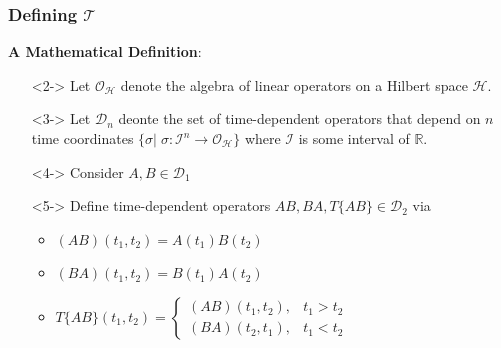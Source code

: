 \documentclass{beamer}
\begin{document}
\begin{frame}
\frametitle{Defining $\mathscr{T}$}
\alert{\textbf{A Mathematical Definition}:}
\begin{itemize}
    \item[\textbullet]<2-> Let $\mathcal{O}_{\mathcal{H}}$ denote the algebra of linear operators on a Hilbert space $\mathcal{H}$.
    \item[\textbullet]<3-> Let $\mathcal{D}_n$ deonte the set of time-dependent operators that depend on $n$ time coordinates $\{\sigma|\;\sigma:\mathcal{I}^n\to\mathcal{O}_{\mathcal{H}}\}$ where $\mathcal{I}$ is some interval of $\mathbb{R}$.
    \item[\textbullet]<4-> Consider $A, B \in \mathcal{D}_1$
    \item[\textbullet]<5-> Define time-dependent operators $AB, BA, T\{AB\} \in \mathcal{D}_2$ via
    \begin{itemize}
        \item<6-> $(AB)(t_1, t_2) = A(t_1)B(t_2)$
        \vspace{0.1cm}
        \item<7-> $(BA)(t_1, t_2) = B(t_1)A(t_2)$
        \vspace{0.1cm}
        \item<8-> $T\{AB\}(t_1, t_2) = \begin{cases}
			(AB)(t_1, t_2), & t_1 > t_2 \\
            (BA)(t_2, t_1), & t_1 < t_2
		 \end{cases}$
    \end{itemize} 
\end{itemize}
\end{frame}
\end{document}
